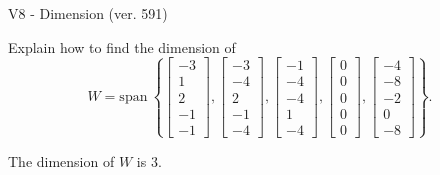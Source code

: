 \begin{exercise}
  \begin{exerciseTitle}V8 - Dimension (ver. 591)\end{exerciseTitle}
  \begin{exerciseStatement}
    Explain how to find the dimension of 
\[W=\mathrm{span}\ \left\{\left[\begin{array}{r}
-3 \\
1 \\
2 \\
-1 \\
-1
\end{array}\right] , \left[\begin{array}{r}
-3 \\
-4 \\
2 \\
-1 \\
-4
\end{array}\right] , \left[\begin{array}{r}
-1 \\
-4 \\
-4 \\
1 \\
-4
\end{array}\right] , \left[\begin{array}{r}
0 \\
0 \\
0 \\
0 \\
0
\end{array}\right] , \left[\begin{array}{r}
-4 \\
-8 \\
-2 \\
0 \\
-8
\end{array}\right]\right\}.\]



  \end{exerciseStatement}
  \begin{exerciseAnswer}
   The dimension of \(W\) is  \(3\).
  


  \end{exerciseAnswer}
\end{exercise}